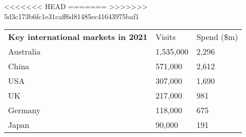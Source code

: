 <<<<<<< HEAD
=======
>>>>>>> 5d3c173b6fc1e31caff6d81485ec41643975baf1
\begin{tabular}[t]{p{4.7cm}>{\hfill}p{1.1cm}>{\hfill}p{1.7cm}}
 \textbf{Key international markets in 2021} & Visits & Spend (\$m) \\ 
 Australia & 1,535,000 & 2,296 \\ 
  China &   571,000 & 2,612 \\ 
  USA &   307,000 & 1,690 \\ 
  UK &   217,000 & 981 \\ 
  Germany &   118,000 & 675 \\ 
  Japan &    90,000 & 191 \\ 
  \end{tabular}
